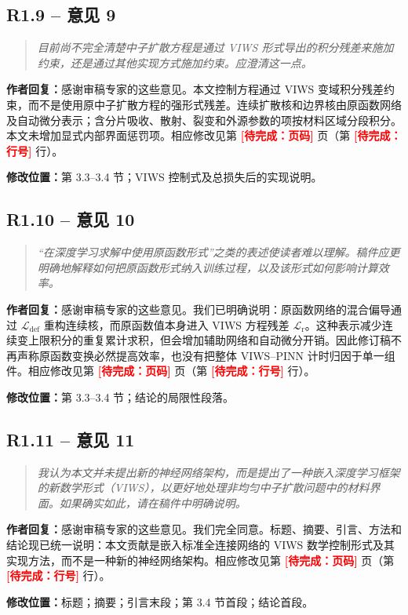\documentclass[11pt,a4paper]{article}
\newenvironment{reviewercomment}{\begin{quote}\small\itshape\color{commentgray}}{\end{quote}}
\newcommand{\authorresponse}{\noindent\textbf{作者回复：}\quad}
\newcommand{\revisionlocation}[1]{\par\noindent\textcolor{locationblue}{\textbf{修改位置：}}#1}
\newcommand{\draftplaceholder}[1]{\textcolor{red}{\textbf{[待完成：#1]}}}
\begin{document}
\subsection*{R1.9 -- 意见 9}
\begin{reviewercomment}
目前尚不完全清楚中子扩散方程是通过 VIWS 形式导出的积分残差来施加约束，还是通过其他实现方式施加约束。应澄清这一点。
\end{reviewercomment}
\authorresponse 感谢审稿专家的这些意见。本文控制方程通过 VIWS 变域积分残差约束，而不是使用原中子扩散方程的强形式残差。连续扩散核和边界核由原函数网络及自动微分表示；含分片吸收、散射、裂变和外源参数的项按材料区域分段积分。本文未增加显式内部界面惩罚项。相应修改见第 \draftplaceholder{页码} 页（第 \draftplaceholder{行号} 行）。
\revisionlocation{第 3.3--3.4 节；VIWS 控制式及总损失后的实现说明。}

\subsection*{R1.10 -- 意见 10}
\begin{reviewercomment}
“在深度学习求解中使用原函数形式”之类的表述使读者难以理解。稿件应更明确地解释如何把原函数形式纳入训练过程，以及该形式如何影响计算效率。
\end{reviewercomment}
\authorresponse 感谢审稿专家的这些意见。我们已明确说明：原函数网络的混合偏导通过 $\mathcal L_{\mathrm{def}}$ 重构连续核，而原函数值本身进入 VIWS 方程残差 $\mathcal L_{\mathrm r}$。这种表示减少连续变上限积分的重复累计求积，但会增加辅助网络和自动微分开销。因此修订稿不再声称原函数变换必然提高效率，也没有把整体 VIWS--PINN 计时归因于单一组件。相应修改见第 \draftplaceholder{页码} 页（第 \draftplaceholder{行号} 行）。
\revisionlocation{第 3.3--3.4 节；结论的局限性段落。}

\subsection*{R1.11 -- 意见 11}
\begin{reviewercomment}
我认为本文并未提出新的神经网络架构，而是提出了一种嵌入深度学习框架的新数学形式（VIWS），以更好地处理非均匀中子扩散问题中的材料界面。如果确实如此，请在稿件中明确说明。
\end{reviewercomment}
\authorresponse 感谢审稿专家的这些意见。我们完全同意。标题、摘要、引言、方法和结论现已统一说明：本文贡献是嵌入标准全连接网络的 VIWS 数学控制形式及其实现方法，而不是一种新的神经网络架构。相应修改见第 \draftplaceholder{页码} 页（第 \draftplaceholder{行号} 行）。
\revisionlocation{标题；摘要；引言末段；第 3.4 节首段；结论首段。}
\end{document}
